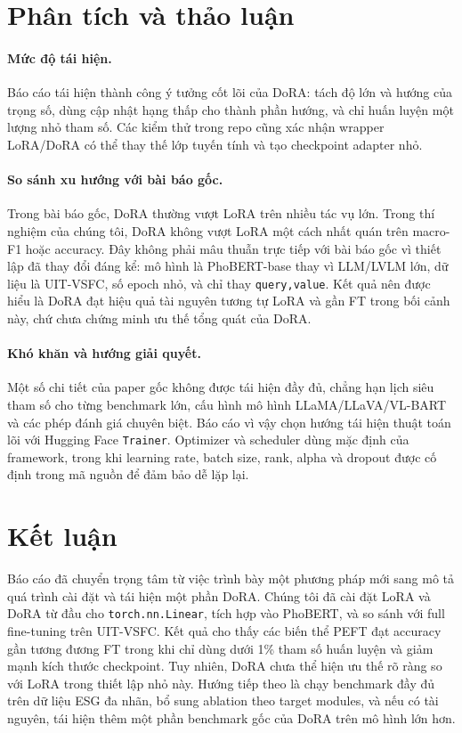 \documentclass{article}
\theoremstyle{plain}
\theoremstyle{definition}
\begin{document}
\section{Phân tích và thảo luận}

\paragraph{Mức độ tái hiện.}
Báo cáo tái hiện thành công ý tưởng cốt lõi của DoRA: tách độ lớn và hướng của trọng số, dùng cập nhật hạng thấp cho thành phần hướng, và chỉ huấn luyện một lượng nhỏ tham số. Các kiểm thử trong repo cũng xác nhận wrapper LoRA/DoRA có thể thay thế lớp tuyến tính và tạo checkpoint adapter nhỏ.

\paragraph{So sánh xu hướng với bài báo gốc.}
Trong bài báo gốc, DoRA thường vượt LoRA trên nhiều tác vụ lớn. Trong thí nghiệm của chúng tôi, DoRA không vượt LoRA một cách nhất quán trên macro-F1 hoặc accuracy. Đây không phải mâu thuẫn trực tiếp với bài báo gốc vì thiết lập đã thay đổi đáng kể: mô hình là PhoBERT-base thay vì LLM/LVLM lớn, dữ liệu là UIT-VSFC, số epoch nhỏ, và chỉ thay \texttt{query,value}. Kết quả nên được hiểu là DoRA đạt hiệu quả tài nguyên tương tự LoRA và gần FT trong bối cảnh này, chứ chưa chứng minh ưu thế tổng quát của DoRA.

\paragraph{Khó khăn và hướng giải quyết.}
Một số chi tiết của paper gốc không được tái hiện đầy đủ, chẳng hạn lịch siêu tham số cho từng benchmark lớn, cấu hình mô hình LLaMA/LLaVA/VL-BART và các phép đánh giá chuyên biệt. Báo cáo vì vậy chọn hướng tái hiện thuật toán lõi với Hugging Face \texttt{Trainer}. Optimizer và scheduler dùng mặc định của framework, trong khi learning rate, batch size, rank, alpha và dropout được cố định trong mã nguồn để đảm bảo dễ lặp lại.


\section{Kết luận}

Báo cáo đã chuyển trọng tâm từ việc trình bày một phương pháp mới sang mô tả quá trình cài đặt và tái hiện một phần DoRA. Chúng tôi đã cài đặt LoRA và DoRA từ đầu cho \texttt{torch.nn.Linear}, tích hợp vào PhoBERT, và so sánh với full fine-tuning trên UIT-VSFC. Kết quả cho thấy các biến thể PEFT đạt accuracy gần tương đương FT trong khi chỉ dùng dưới 1\% tham số huấn luyện và giảm mạnh kích thước checkpoint. Tuy nhiên, DoRA chưa thể hiện ưu thế rõ ràng so với LoRA trong thiết lập nhỏ này. Hướng tiếp theo là chạy benchmark đầy đủ trên dữ liệu ESG đa nhãn, bổ sung ablation theo target modules, và nếu có tài nguyên, tái hiện thêm một phần benchmark gốc của DoRA trên mô hình lớn hơn.
\end{document}
